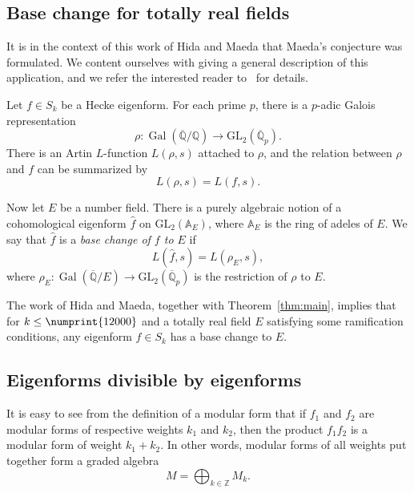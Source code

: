 \documentclass[11pt]{article}
\theoremstyle{plain}
\theoremstyle{definition}
\theoremstyle{remark}
\numberwithin{equation}{section}
\newcommand{\longto}{\longrightarrow}
\newcommand{\ZZ}{\mathbb{Z}}
\newcommand{\QQ}{\mathbb{Q}}
\newcommand{\Gal}{\operatorname{Gal}}
\newcommand{\bound}{\numprint{12000}}
\newcommand{\GL}{\mathrm{GL}}
\begin{document}
\subsection{Base change for totally real fields}
It is in the context of this work of Hida and Maeda that
Maeda's conjecture was formulated.  We content ourselves with giving a general
description of this application, and we refer the interested reader
to~\cite{HidaMaeda} for details. 

Let $f\in S_k$ be a Hecke eigenform.  For each prime $p$, there is a $p$-adic
Galois representation
\begin{equation*}
  \rho\colon\Gal\left(\overline{\QQ}/\QQ\right)
  \longto\GL_2\left(\overline{\QQ}_p\right).
\end{equation*}
There is an Artin $L$-function $L(\rho, s)$ attached to $\rho$, and the
relation between $\rho$ and $f$ can be summarized by
\begin{equation*}
  L(\rho, s) = L(f, s).
\end{equation*}

Now let $E$ be a number field.  There is a purely algebraic notion of a
cohomological eigenform $\hat{f}$ on $\GL_2(\mathbb{A}_E)$, where 
$\mathbb{A}_E$ is the ring
of adeles of $E$.  We say that $\hat{f}$ is a \emph{base change of $f$ to $E$}
if
\begin{equation*}
  L(\hat{f}, s) = L(\rho_E, s),
\end{equation*}
where $\rho_E\colon\Gal(\overline{\QQ}/E)\longto\GL_2(\overline{\QQ}_p)$ is
the restriction of $\rho$ to $E$.

The work of Hida and Maeda, together with Theorem~\ref{thm:main}, implies that
for $k\leq\bound$ and a totally real field $E$ satisfying some ramification
conditions, any eigenform $f\in S_k$ has a base change to $E$.

\subsection{Eigenforms divisible by eigenforms}
It is easy to see from the definition of a modular form that if $f_1$ and
$f_2$ are modular forms of respective weights $k_1$ and $k_2$, then the
product $f_1f_2$ is a modular form of weight $k_1+k_2$.  In other words,
modular forms of all weights put together form a graded algebra
\begin{equation*}
  M=\bigoplus_{k\in\ZZ} M_k.
\end{equation*}
\end{document}

